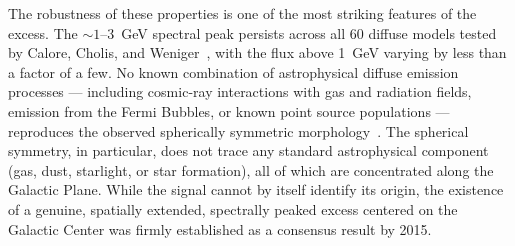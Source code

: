 The robustness of these properties is one of the most striking features of the excess.
The $\sim 1$--$3$~GeV spectral peak persists across all 60 diffuse models tested by Calore, Cholis, and Weniger~\cite{Calore:2014xka}, with the flux above 1~GeV varying by less than a factor of a few.
No known combination of astrophysical diffuse emission processes --- including cosmic-ray interactions with gas and radiation fields, emission from the Fermi Bubbles, or known point source populations --- reproduces the observed spherically symmetric morphology~\cite{Daylan:2014rsa}.
The spherical symmetry, in particular, does not trace any standard astrophysical component (gas, dust, starlight, or star formation), all of which are concentrated along the Galactic Plane.
While the signal cannot by itself identify its origin, the existence of a genuine, spatially extended, spectrally peaked excess centered on the Galactic Center was firmly established as a consensus result by 2015.
